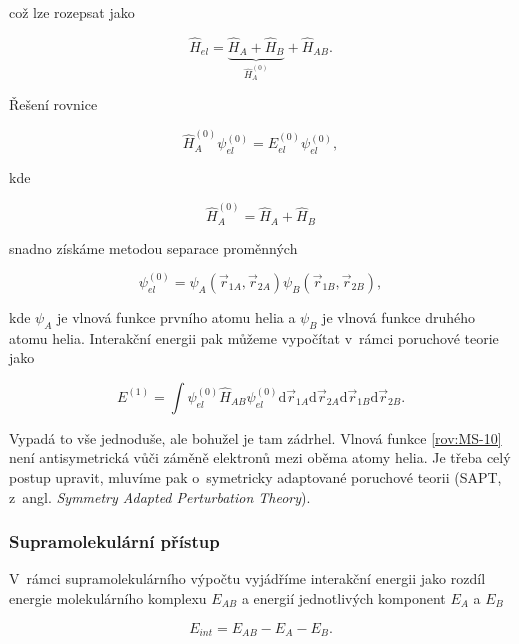 \noindent což lze rozepsat jako 

\begin{equation}
\hat{H}_{el} = \underbrace{\hat{H}_A + \hat{H}_B}_{\hat{H}_A^{(0)}} + \hat{H}_{AB}.
\label{rov:MS-7}
\end{equation}

\noindent Řešení rovnice 

\begin{equation}
\hat{H}_{A}^{(0)} \psi_{el}^{(0)} = E_{el}^{(0)} \psi_{el}^{(0)},
\label{rov:MS-8}
\end{equation}

\noindent kde 

\begin{equation}
\hat{H}_A^{(0)} = \hat{H}_A + \hat{H}_B
\label{rov:MS-9}
\end{equation}


\noindent snadno získáme metodou separace proměnných

\begin{equation}
\psi_{el}^{(0)} = \psi_A (\vec{r}_{1A}, \vec{r}_{2A}) \psi_B (\vec{r}_{1B},\vec{r}_{2B}),
\label{rov:MS-10}
\end{equation}


\noindent kde $\psi_A$ je vlnová funkce prvního atomu helia a $\psi_B$ je vlnová funkce druhého atomu helia. Interakční energii pak můžeme vypočítat v~rámci poruchové teorie jako


\begin{equation}
E^{(1)} = \int \psi_{el}^{(0)} \hat{H}_{AB} \psi_{el}^{(0)} \mathrm{d} \vec{r}_{1A} \mathrm{d} \vec{r}_{2A} \mathrm{d} \vec{r}_{1B} \mathrm{d} \vec{r}_{2B}.
\label{rov:MS-11}
\end{equation}


Vypadá to vše jednoduše, ale bohužel je tam zádrhel. Vlnová funkce \eqref{rov:MS-10} není antisymetrická vůči záměně elektronů mezi oběma atomy helia. Je třeba celý postup upravit, mluvíme pak o~symetricky adaptované poruchové teorii (SAPT, z~angl. \textit{Symmetry Adapted Perturbation Theory}). 


\subsubsection{Supramolekulární přístup}
V~rámci supramolekulárního výpočtu vyjádříme interakční energii jako rozdíl energie molekulárního komplexu $E_{AB}$ a energií jednotlivých komponent $E_A$ a $E_B$

\begin{equation}
E_{int} = E_{AB} - E_A - E_B.
\label{rov:MS-12}
\end{equation}


